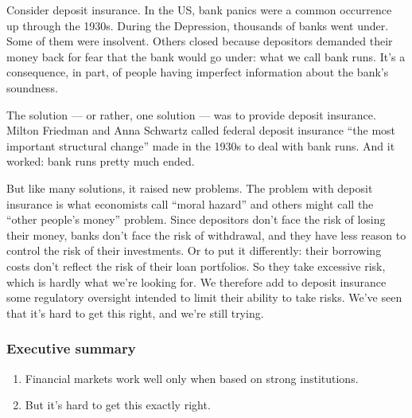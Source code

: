 \documentclass[letterpaper,12pt]{article}
\begin{document}
Consider deposit insurance.  
In the US, bank panics were a common occurrence
up through the 1930s.
During the Depression,
thousands of banks went under.
Some of them were insolvent.
Others closed because depositors demanded their money back
for fear that the bank would go under:
what we call bank runs.  
It's a consequence, in part, of people having imperfect 
information about the bank's soundness.  

The solution --- or rather, one solution --- was to provide deposit insurance.
Milton Friedman and Anna Schwartz called federal
deposit insurance ``the most important structural change''
made in the 1930s to deal with bank runs.
And it worked:  bank runs pretty much ended.

But like many solutions, it raised new problems.
The problem with deposit insurance is what economists call ``moral hazard''
and others might call the ``other people's money'' problem.
Since depositors don't face the risk of losing their money,
banks don't face the risk of withdrawal, 
and they have less reason to control the risk of their investments.
Or to put it differently:  their borrowing costs don't reflect the risk
of their loan portfolios.  
So they take excessive risk, which is hardly what we're looking for.  
We therefore add to deposit insurance some regulatory oversight intended
to limit their ability to take risks.  
We've seen that it's hard to get this right, 
and we're still trying.  


\subsubsection*{Executive summary}

\begin{enumerate}
\item Financial markets work well only when based on strong institutions.
\item But it's hard to get this exactly right.  
\end{enumerate}

\begin{comment}
\subsubsection*{Review questions}

\begin{enumerate}

\item ...
\end{enumerate}
\end{comment}
\end{document}
